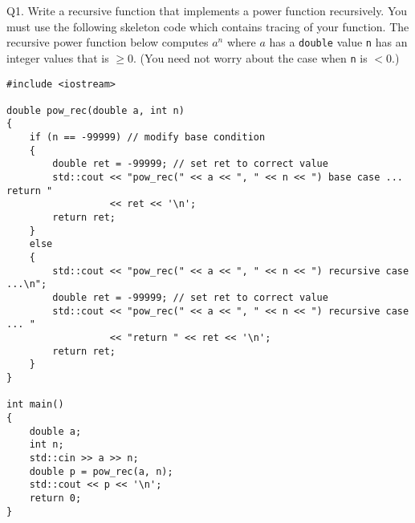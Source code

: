 \begin{comment}
Q1. [Review of CISS245]

Write a matrix class of \texttt{double}s.
You should have addition, subtraction, multiplication,
scalar multiplication, etc.
You can also compare matrices: \verb!==! and \verb@!=@.
You can get the number of rows and number of columns using
\verb!m.nroww()!
and
\verb!m.ncols()!
If you are not familiar with matrix multiplication,
check online or see below.
Also, write the the determinant function.
\begin{Verbatim}[frame=single]
Mat m0(3, 4);    // 3-by-4 matrix
Mat m1(3, 4, 0); // 3-by-4 matrix of zeroes
m0(1, 2) = 5.0;  // Set row 1, column 2 to 5.0
Mat m2 = m0;     // The obvious copy constructor
m2 += m1;        // The obvious += operator
m2 = m2 + m1;
m2 -= m1;
m2 = m2 - m1;

Mat m3(4, 3, 2); // 4-by-3 matrix of 2s
Mat m4(3, 3);
m4 = m2 * m3;

m4 = 0.5 * m4;
m4 = m4 * 0.5;
m4 *= 0.5;

Mat m5 = Mat::identity(3); // m5 is 3-by-3 identity matrix

double x[] = {1.1, 2.2, 3.3, 4.4, 5.5, 6.6};
Mat m6(2, 3, x); // m6 is 2-by-3 filled with values from x
\end{Verbatim}
For output, if \verb!m! models this array
\[
\begin{bmatrix}
1 & 2 & 3.3 \\
4.56 & 5 & 6 
\end{bmatrix}
\]
the output should be
\begin{Verbatim}
[[   1 2 3.3]
 [4.56 5   6]]
\end{Verbatim}
(For the output, go online and check C++ string stream class.
You can cout the values of the matrix to a string stream object
which will then give you the lengths of the output of all entries.)
\end{comment}
\newpage
Q1. Write a recursive function that implements a power function
recursively. You must use the following skeleton code which
contains tracing of your function.
The recursive power function below computes $a^n$ where $a$ has a 
\verb!double! value \verb!n! has an integer values that is $\geq 0$.
(You need not worry about the case when \verb!n! is $< 0$.)
\begin{Verbatim}[frame=single, fontsize=\small]
#include <iostream>

double pow_rec(double a, int n)
{
    if (n == -99999) // modify base condition
    {
        double ret = -99999; // set ret to correct value
        std::cout << "pow_rec(" << a << ", " << n << ") base case ... return "
                  << ret << '\n';
        return ret;
    }
    else
    {
        std::cout << "pow_rec(" << a << ", " << n << ") recursive case ...\n";
        double ret = -99999; // set ret to correct value
        std::cout << "pow_rec(" << a << ", " << n << ") recursive case ... "
                  << "return " << ret << '\n';
        return ret;        
    }
}

int main()
{
    double a;
    int n;
    std::cin >> a >> n;
    double p = pow_rec(a, n);
    std::cout << p << '\n';
    return 0;
}
\end{Verbatim}

